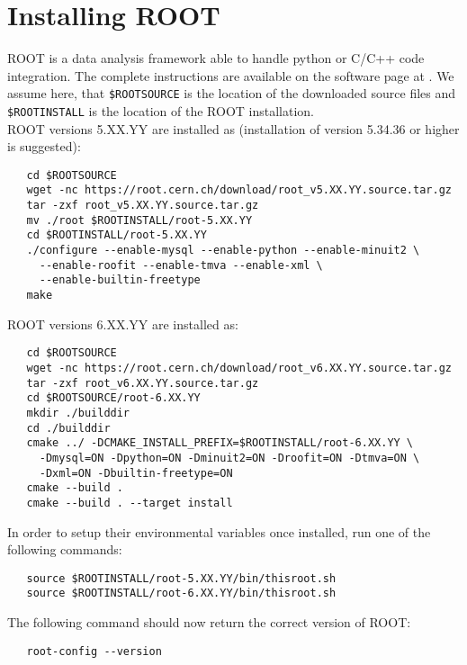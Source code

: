 \documentclass[12pt,a4paper]{report}
\begin{document}
\section{Installing ROOT}
ROOT is a data analysis framework able to handle python or C/C++ code integration. The complete instructions are available on the software page at \cite{root}. We assume here, that \texttt{\$ROOTSOURCE} is the location of the downloaded source files and \texttt{\$ROOTINSTALL} is the location of the ROOT installation.\\
ROOT versions 5.XX.YY are installed as (installation of version 5.34.36 or higher is suggested):
\begin{verbatim}
   cd $ROOTSOURCE
   wget -nc https://root.cern.ch/download/root_v5.XX.YY.source.tar.gz
   tar -zxf root_v5.XX.YY.source.tar.gz
   mv ./root $ROOTINSTALL/root-5.XX.YY
   cd $ROOTINSTALL/root-5.XX.YY
   ./configure --enable-mysql --enable-python --enable-minuit2 \
     --enable-roofit --enable-tmva --enable-xml \
     --enable-builtin-freetype
   make
\end{verbatim}
ROOT versions 6.XX.YY are installed as:
\begin{verbatim}
   cd $ROOTSOURCE
   wget -nc https://root.cern.ch/download/root_v6.XX.YY.source.tar.gz
   tar -zxf root_v6.XX.YY.source.tar.gz
   cd $ROOTSOURCE/root-6.XX.YY
   mkdir ./builddir
   cd ./builddir
   cmake ../ -DCMAKE_INSTALL_PREFIX=$ROOTINSTALL/root-6.XX.YY \
     -Dmysql=ON -Dpython=ON -Dminuit2=ON -Droofit=ON -Dtmva=ON \
     -Dxml=ON -Dbuiltin-freetype=ON
   cmake --build .
   cmake --build . --target install
\end{verbatim}
In order to setup their environmental variables once installed, run one of the following commands:
\begin{verbatim}
   source $ROOTINSTALL/root-5.XX.YY/bin/thisroot.sh
   source $ROOTINSTALL/root-6.XX.YY/bin/thisroot.sh
\end{verbatim}
The following command should now return the correct version of ROOT:
\begin{verbatim}
   root-config --version
\end{verbatim}
\end{document}
